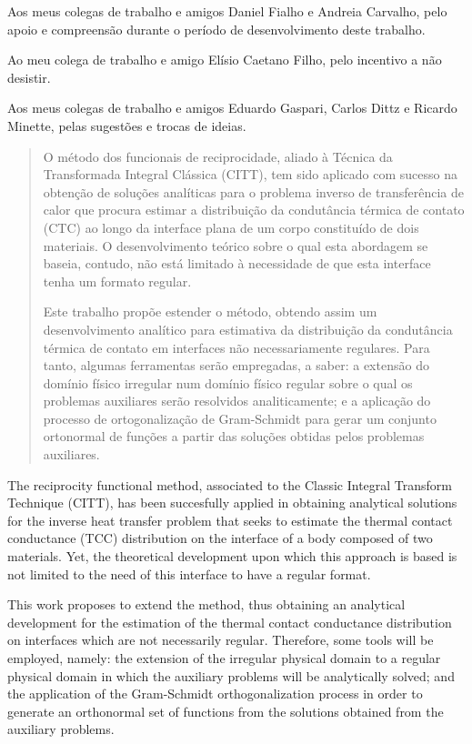\documentclass[msc,numbers, fleqn]{coppe}
\numberwithin{figure}{section}
\numberwithin{table}{section}
\numberwithin{equation}{section}
\begin{document}
  Aos meus colegas de trabalho e amigos Daniel Fialho e Andreia Carvalho, pelo apoio e compreensão durante o período de desenvolvimento deste trabalho.
  
  Ao meu colega de trabalho e amigo Elísio Caetano Filho, pelo incentivo a não desistir.
  
  Aos meus colegas de trabalho e amigos Eduardo Gaspari, Carlos Dittz e Ricardo Minette, pelas sugestões e trocas de ideias.
  

 
 \begin{abstract}
 
O método dos funcionais de reciprocidade, aliado à Técnica da Transformada Integral Clássica (CITT), tem sido aplicado com sucesso na obtenção de
soluções analíticas para o problema inverso de transferência de calor que procura estimar a distribuição da condutância térmica de contato (CTC) ao longo da interface plana
de um corpo constituído de dois materiais. O desenvolvimento teórico sobre o qual esta abordagem se baseia, contudo, não está limitado à necessidade de que esta
interface tenha um formato regular.

Este trabalho propõe estender o método, obtendo assim um desenvolvimento analítico para estimativa da distribuição da condutância térmica de contato em interfaces não necessariamente
regulares. Para tanto, algumas ferramentas serão empregadas, a saber: a extensão do domínio físico irregular num domínio físico regular sobre o qual os
problemas auxiliares serão resolvidos analiticamente; e a aplicação do processo de ortogonalização de Gram-Schmidt para gerar um conjunto ortonormal
de funções a partir das soluções obtidas pelos problemas auxiliares.


  \end{abstract}
  
  \begin{foreignabstract}

The reciprocity functional method, associated to the Classic Integral Transform Technique (CITT), has been succesfully applied in obtaining analytical
solutions for the inverse heat transfer problem that seeks to estimate the thermal contact conductance (TCC) distribution on the interface of a body composed of
two materials. Yet, the theoretical development upon which this approach is based is not limited to the need of this interface to have a regular format.

This work proposes to extend the method, thus obtaining an analytical development for the estimation of the thermal contact conductance distribution on interfaces which
are not necessarily regular. Therefore, some tools will be employed, namely: the extension of the irregular physical domain to a regular physical domain in
which the auxiliary problems will be analytically solved; and the application of the Gram-Schmidt orthogonalization process in order to generate an orthonormal set
of functions from the solutions obtained from the auxiliary problems.
 
  \end{foreignabstract}
\end{document}
